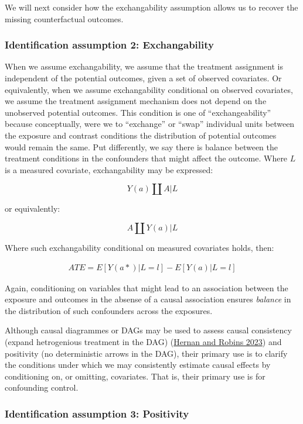 \documentclass[
  singlecolumn]{report}
\begin{document}
We will next consider how the exchangability assumption allows us to
recover the missing counterfactual outcomes.

\hypertarget{identification-assumption-2-exchangability}{%
\subsubsection{Identification assumption 2:
Exchangability}\label{identification-assumption-2-exchangability}}

When we assume exchangability, we assume that the treatment assignment
is independent of the potential outcomes, given a set of observed
covariates. Or equivalently, when we assume exchangability conditional
on observed covariates, we assume the treatment assignment mechanism
does not depend on the unobserved potential outcomes. This condition is
one of ``exchangeability'' because conceptually, were we to ``exchange''
or ``swap'' individual units between the exposure and contrast
conditions the distribution of potential outcomes would remain the same.
Put differently, we say there is balance between the treatment
conditions in the confounders that might affect the outcome. Where \(L\)
is a measured covariate, exchangability may be expressed:

\[Y(a)\coprod  A|L\]

or equivalently:

\[A \coprod  Y(a)|L\]

Where such exchangability conditional on measured covariates holds,
then:

\[
\begin{aligned}
ATE = E[Y(a*)|L = l] - E[Y(a)|L = l] 
\end{aligned}
\]

Again, conditioning on variables that might lead to an association
between the exposure and outcomes in the absense of a causal association
ensures \emph{balance} in the distribution of such confounders across
the exposures.

Although causal diagrammes or DAGs may be used to assess causal
consistency (expand hetrogenious treatment in the DAG)
(\protect\hyperlink{ref-hernan2023}{Hernan and Robins 2023}) and
positivity (no deterministic arrows in the DAG), their primary use is to
clarify the conditions under which we may consistently estimate causal
effects by conditioning on, or omitting, covariates. That is, their
primary use is for confounding control.

\hypertarget{identification-assumption-3-positivity}{%
\subsubsection{Identification assumption 3:
Positivity}\label{identification-assumption-3-positivity}}
\end{document}
